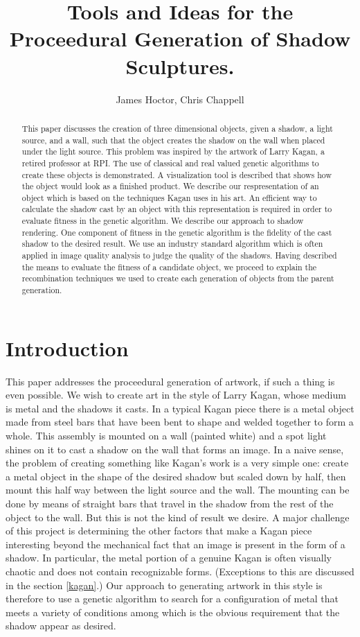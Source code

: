\documentclass[letter,10pt]{article}
\title{Tools and Ideas for the Proceedural Generation of Shadow Sculptures.}
\author{James Hoctor, Chris Chappell}
\begin{document}
\maketitle

\begin{abstract}
This paper discusses the creation of three dimensional objects,
given a shadow, a light source, and a wall, such that the object
creates the shadow on the wall when placed under the light source.
This problem was inspired by the artwork of Larry Kagan, a retired
professor at RPI. The use of classical and real valued genetic
algorithms to create these objects is demonstrated. A visualization
tool is described that shows how the object would look as a finished
product. We describe our respresentation of an object which is based
on the techniques Kagan uses in his art. An efficient way to
calculate the shadow cast by an object with this representation is
required in order to evaluate fitness in the genetic algorithm. We
describe our approach to shadow rendering. One component of fitness
in the genetic algorithm is the fidelity of the cast shadow to the
desired result. We use an industry standard algorithm which is often
applied in image quality analysis to judge the quality of the
shadows. Having described the means to evaluate the fitness of a
candidate object, we proceed to explain the recombination techniques
we used to create each generation of objects from the parent generation.
\end{abstract}

\section*{Introduction}
This paper addresses the proceedural generation of artwork, if such
a thing is even possible. We wish to create art in the style of
Larry Kagan, whose medium is metal and the shadows it casts. In a
typical Kagan piece there is a metal object made from steel bars
that have been bent to shape and welded together to form a whole.
This assembly is mounted on a wall (painted white) and a spot light
shines on it to cast a shadow on the wall that forms an image. In a
naive sense, the problem  of creating something like Kagan's work is
a very simple one: create a metal object in the shape of the desired
shadow but scaled down by half, then mount this half way between the
light source and the wall. The mounting can be done by means of
straight bars that travel in the shadow from the rest of the object
to the wall. But this is not the kind of result we desire. A major
challenge of this project is determining the other factors that make
a Kagan piece interesting beyond the mechanical fact that an image
is present in the form of a shadow. In particular, the metal portion
of a genuine Kagan is often visually chaotic and does not contain
recognizable forms. (Exceptions to this are discussed in the section
\ref{kagan}.) Our approach to generating artwork in this style
is therefore to use a genetic algorithm to search for a configuration
of metal that meets a variety of conditions among which is the
obvious requirement that the shadow appear as desired.
\end{document}
